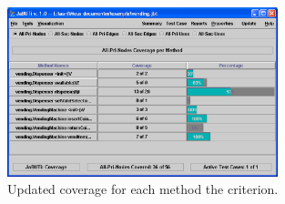\begin{figure}[!ht]
\begin{center}
\includegraphics[width=0.70\textwidth]{fig/summary-by-method-tc1}
\caption{\label{fig:summary-method-input1} Updated coverage for
each method \wrt the  criterion.}
\end{center}
\end{figure}
